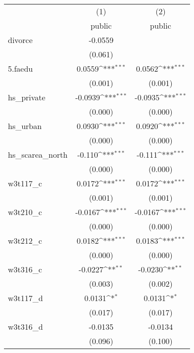 {
\def\sym#1{\ifmmode^{#1}\else\(^{#1}\)\fi}
\begin{tabular}{l*{2}{c}}
\hline\hline
            &\multicolumn{1}{c}{(1)}&\multicolumn{1}{c}{(2)}\\
            &\multicolumn{1}{c}{public}&\multicolumn{1}{c}{public}\\
\hline
divorce     &     -0.0559         &                     \\
            &     (0.061)         &                     \\
[1em]
5.faedu     &      0.0559\sym{***}&      0.0562\sym{***}\\
            &     (0.001)         &     (0.001)         \\
[1em]
hs\_private  &     -0.0939\sym{***}&     -0.0935\sym{***}\\
            &     (0.000)         &     (0.000)         \\
[1em]
hs\_urban    &      0.0930\sym{***}&      0.0920\sym{***}\\
            &     (0.000)         &     (0.000)         \\
[1em]
hs\_scarea\_north&      -0.110\sym{***}&      -0.111\sym{***}\\
            &     (0.000)         &     (0.000)         \\
[1em]
w3t117\_c    &      0.0172\sym{***}&      0.0172\sym{***}\\
            &     (0.001)         &     (0.001)         \\
[1em]
w3t210\_c    &     -0.0167\sym{***}&     -0.0167\sym{***}\\
            &     (0.000)         &     (0.000)         \\
[1em]
w3t212\_c    &      0.0182\sym{***}&      0.0183\sym{***}\\
            &     (0.000)         &     (0.000)         \\
[1em]
w3t316\_c    &     -0.0227\sym{**} &     -0.0230\sym{**} \\
            &     (0.003)         &     (0.002)         \\
[1em]
w3t117\_d    &      0.0131\sym{*}  &      0.0131\sym{*}  \\
            &     (0.017)         &     (0.017)         \\
[1em]
w3t316\_d    &     -0.0135         &     -0.0134         \\
            &     (0.096)         &     (0.100)         \\
[1em]

\end{tabular}}
